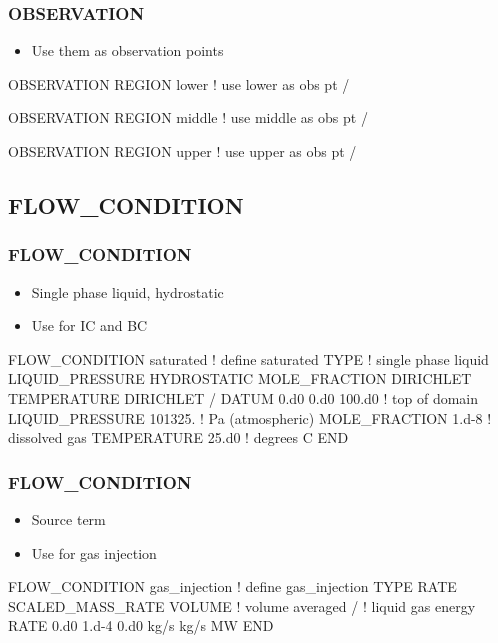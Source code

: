 \documentclass{beamer}
\newcommand\redcomment[1]{{{\color{red} #1}}}
\newcommand\bluecomment[1]{{{\color{blue} #1}}}
\newcommand\greencomment[1]{{{\color{green} #1}}}
\begin{document}
\begin{frame}[fragile]\frametitle{OBSERVATION}
\begin{itemize}
  \item{Use them as \redcomment{observation points}}
\end{itemize}

\begin{semiverbatim}\small
OBSERVATION
  REGION lower \bluecomment{! use} \greencomment{lower} \bluecomment{as obs pt}
/

OBSERVATION
  REGION middle \bluecomment{! use} \greencomment{middle} \bluecomment{as obs pt}
/

OBSERVATION
  REGION upper \bluecomment{! use} \greencomment{upper} \bluecomment{as obs pt}
/
\end{semiverbatim}
\end{frame}

\subsection{FLOW\_CONDITION}

\begin{frame}[fragile]\frametitle{FLOW\_CONDITION}
\begin{itemize}
  \item{Single phase liquid, hydrostatic}
  \item{Use for \redcomment{IC} and \redcomment{BC}}
\end{itemize}

\begin{semiverbatim}
FLOW_CONDITION saturated \bluecomment{! define }\greencomment{saturated} 
  TYPE                   \bluecomment{! single phase liquid}
    LIQUID_PRESSURE HYDROSTATIC
    MOLE_FRACTION DIRICHLET
    TEMPERATURE DIRICHLET
  /
  DATUM 0.d0 0.d0 100.d0  \bluecomment{! top of domain}
  LIQUID_PRESSURE 101325. \bluecomment{! Pa (atmospheric)}
  MOLE_FRACTION 1.d-8     \bluecomment{! dissolved gas}
  TEMPERATURE 25.d0       \bluecomment{! degrees C}
END
\end{semiverbatim}
\end{frame}

\begin{frame}[fragile]\frametitle{FLOW\_CONDITION}
\begin{itemize}
  \item{\redcomment{Source} term}
  \item{Use for gas injection}
\end{itemize}

\begin{semiverbatim}
FLOW_CONDITION gas_injection \bluecomment{! define }\greencomment{gas_injection} 
  TYPE
    RATE SCALED_MASS_RATE VOLUME \bluecomment{! volume averaged}
  /
       \bluecomment{! liquid gas energy}
  RATE 0.d0 1.d-4 0.d0 kg/s kg/s MW
END
\end{semiverbatim}
\end{frame}
\end{document}
